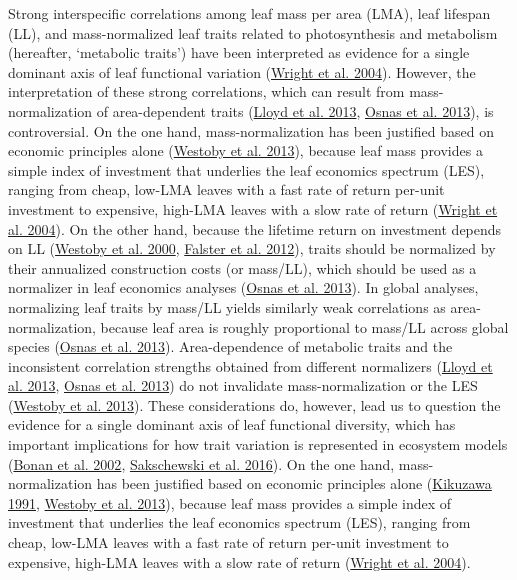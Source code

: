 \documentclass[
  12pt,
  letterpaper,
  DIV=11,
  numbers=noendperiod]{scrartcl}
\begin{document}
Strong interspecific correlations among leaf mass per area (LMA), leaf
lifespan (LL), and mass-normalized leaf traits related to photosynthesis
and metabolism (hereafter, `metabolic traits') have been interpreted as
evidence for a single dominant axis of leaf functional variation
(\protect\hyperlink{ref-Wright2004a}{Wright et al. 2004}). However, the
interpretation of these strong correlations, which can result from
mass-normalization of area-dependent traits
(\protect\hyperlink{ref-Lloyd2013}{Lloyd et al. 2013},
\protect\hyperlink{ref-Osnas2013}{Osnas et al. 2013}), is controversial.
On the one hand, mass-normalization has been justified based on economic
principles alone (\protect\hyperlink{ref-Westoby2013}{Westoby et al.
2013}), because leaf mass provides a simple index of investment that
underlies the leaf economics spectrum (LES), ranging from cheap, low-LMA
leaves with a fast rate of return per-unit investment to expensive,
high-LMA leaves with a slow rate of return
(\protect\hyperlink{ref-Wright2004a}{Wright et al. 2004}). On the other
hand, because the lifetime return on investment depends on LL
(\protect\hyperlink{ref-Westoby2000}{Westoby et al. 2000},
\protect\hyperlink{ref-Falster2012}{Falster et al. 2012}), traits should
be normalized by their annualized construction costs (or mass/LL), which
should be used as a normalizer in leaf economics analyses
(\protect\hyperlink{ref-Osnas2013}{Osnas et al. 2013}). In global
analyses, normalizing leaf traits by mass/LL yields similarly weak
correlations as area-normalization, because leaf area is roughly
proportional to mass/LL across global species
(\protect\hyperlink{ref-Osnas2013}{Osnas et al. 2013}). Area-dependence
of metabolic traits and the inconsistent correlation strengths obtained
from different normalizers (\protect\hyperlink{ref-Lloyd2013}{Lloyd et
al. 2013}, \protect\hyperlink{ref-Osnas2013}{Osnas et al. 2013}) do not
invalidate mass-normalization or the LES
(\protect\hyperlink{ref-Westoby2013}{Westoby et al. 2013}). These
considerations do, however, lead us to question the evidence for a
single dominant axis of leaf functional diversity, which has important
implications for how trait variation is represented in ecosystem models
(\protect\hyperlink{ref-Bonan2002}{Bonan et al. 2002},
\protect\hyperlink{ref-Sakschewski2016}{Sakschewski et al. 2016}). On
the one hand, mass-normalization has been justified based on economic
principles alone (\protect\hyperlink{ref-Kikuzawa1991}{Kikuzawa 1991},
\protect\hyperlink{ref-Westoby2013}{Westoby et al. 2013}), because leaf
mass provides a simple index of investment that underlies the leaf
economics spectrum (LES), ranging from cheap, low-LMA leaves with a fast
rate of return per-unit investment to expensive, high-LMA leaves with a
slow rate of return (\protect\hyperlink{ref-Wright2004a}{Wright et al.
2004}).
\end{document}
